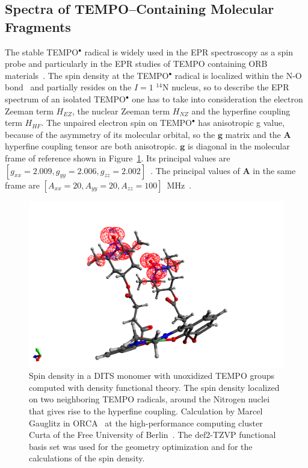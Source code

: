 \subsection{Spectra of TEMPO--Containing Molecular Fragments}
The stable TEMPO$^\bullet$ radical is widely used in the EPR spectroscopy as a spin probe and particularly in the EPR studies of TEMPO containing ORB materials~\cite{nakahara2002_cpl, nishide2004_electact, bahaceci2013_jpowersources, aydin2015_jsoistatelect, khodeir2019_softmatter, Zhang2018}. The spin density at the TEMPO$^\bullet$ radical is localized within the N-O bond~\cite{Owenius2001} and partially resides on the $I=1$ $^{14}$N nucleus, so to describe the EPR spectrum of an isolated TEMPO$^\bullet$ one has to take into consideration the electron Zeeman term $H_{EZ}$, the nuclear Zeeman term $H_{NZ}$ and the hyperfine coupling term $H_{HF}$. The unpaired electron spin on TEMPO$^\bullet$ has anisotropic g value, because of the asymmetry of its molecular orbital, so the $\textbf{g}$ matrix and the $\textbf{A}$ hyperfine coupling tensor are both anisotropic. $\textbf{g}$ is diagonal in the molecular frame of reference shown in Figure~\ref{fig:TEMPO_dft}. Its principal values are $\left[g_{xx}=2.009,g_{yy}=2.006,g_{zz}=2.002\right]$~\cite{Liu_2008,Bordignon2017}. The principal values of $\textbf{A}$ in the same frame are $\left[A_{xx}=20,A_{yy}=20,A_{zz}=100\right]$~MHz~\cite{Liu_2008,Bordignon2017}.


\begin{figure}[h]
\center
	\includegraphics[width=1\textwidth]{./operando_epr/figures/DITS_DFT.pdf}
	\caption{Spin density in a DITS monomer with unoxidized TEMPO groups computed with density functional theory. The spin density localized on two neighboring TEMPO radicals, around the Nitrogen nuclei that gives rise to the hyperfine coupling. Calculation by Marcel Gauglitz in ORCA~\cite{ORCA} at the high-performance computing cluster Curta of the Free University of Berlin~\cite{Curta}. The def2-TZVP functional basis set was used for the geometry optimization and for the calculations of the spin density.}
	\label{fig:TEMPO_dft}
\end{figure}



